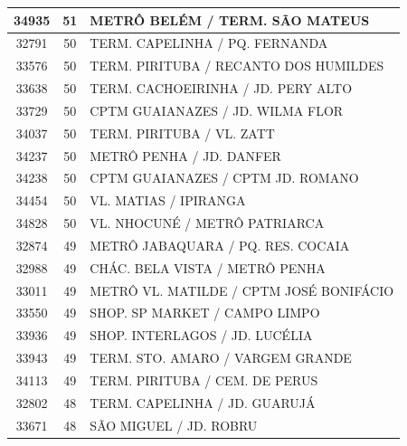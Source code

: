\documentclass[
	12pt,				%
	oneside,			%
	a4paper,			%
	english,			%
	brazil				%
	]{abntex2ppgsi}
\begin{document}
{{\begin{apendicesenv}
\begin{longtable}{c|c|p{7cm}}
    34935 & 51    & METRÔ BELÉM / TERM. SÃO MATEUS \\
\hline

    32791 & 50    & TERM. CAPELINHA / PQ. FERNANDA \\
\hline

    33576 & 50    & TERM. PIRITUBA / RECANTO DOS HUMILDES \\
\hline

    33638 & 50    & TERM. CACHOEIRINHA / JD. PERY ALTO \\
\hline

    33729 & 50    & CPTM GUAIANAZES / JD. WILMA FLOR \\
\hline

    34037 & 50    & TERM. PIRITUBA / VL. ZATT \\
\hline

    34237 & 50    & METRÔ PENHA / JD. DANFER \\
\hline

    34238 & 50    & CPTM GUAIANAZES / CPTM JD. ROMANO \\
\hline

    34454 & 50    & VL. MATIAS / IPIRANGA \\
\hline

    34828 & 50    & VL. NHOCUNÉ / METRÔ PATRIARCA \\
\hline

    32874 & 49    & METRÔ JABAQUARA / PQ. RES. COCAIA \\
\hline

    32988 & 49    & CHÁC. BELA VISTA / METRÔ PENHA \\
\hline

    33011 & 49    & METRÔ VL. MATILDE / CPTM JOSÉ BONIFÁCIO \\
\hline

    33550 & 49    & SHOP. SP MARKET / CAMPO LIMPO \\
\hline

    33936 & 49    & SHOP. INTERLAGOS / JD. LUCÉLIA \\
\hline

    33943 & 49    & TERM. STO. AMARO / VARGEM GRANDE \\
\hline

    34113 & 49    & TERM. PIRITUBA / CEM. DE PERUS \\
\hline

    32802 & 48    & TERM. CAPELINHA / JD. GUARUJÁ \\
\hline

    33671 & 48    & SÃO MIGUEL / JD. ROBRU \\
\hline


\end{longtable}
\end{apendicesenv}}}
\end{document}
